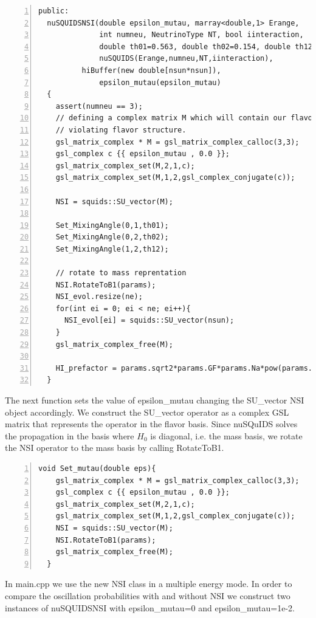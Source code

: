 \documentclass[3p,12pt]{elsarticle}
\newcommand{\ttf}{\ttfamily}
\begin{document}
\begin{lstlisting}[frame=leftline, numbers =
  left,breaklines=true,label = ex:sin1,firstnumber=last]
  public:
  nuSQUIDSNSI(double epsilon_mutau, marray<double,1> Erange,
              int numneu, NeutrinoType NT, bool iinteraction,
              double th01=0.563, double th02=0.154, double th12=0.785):
              nuSQUIDS(Erange,numneu,NT,iinteraction),
	      hiBuffer(new double[nsun*nsun]),
              epsilon_mutau(epsilon_mutau)
  {
    assert(numneu == 3);
    // defining a complex matrix M which will contain our flavor
    // violating flavor structure.
    gsl_matrix_complex * M = gsl_matrix_complex_calloc(3,3);
    gsl_complex c {{ epsilon_mutau , 0.0 }};
    gsl_matrix_complex_set(M,2,1,c);
    gsl_matrix_complex_set(M,1,2,gsl_complex_conjugate(c));
    
    NSI = squids::SU_vector(M);
    
    Set_MixingAngle(0,1,th01);
    Set_MixingAngle(0,2,th02);
    Set_MixingAngle(1,2,th12);
    
    // rotate to mass reprentation
    NSI.RotateToB1(params);
    NSI_evol.resize(ne);
    for(int ei = 0; ei < ne; ei++){
      NSI_evol[ei] = squids::SU_vector(nsun);
    }
    gsl_matrix_complex_free(M);
    
    HI_prefactor = params.sqrt2*params.GF*params.Na*pow(params.cm,-3);
  }
\end{lstlisting}

The next function sets the value of {\ttf epsilon\_mutau} changing the
 {\ttf SU\_vector NSI} object accordingly. We construct the {\ttf
   SU\_vector} operator as a complex GSL matrix that represents the
 operator in the flavor basis. Since {\ttf nuSQuIDS} solves the propagation
 in the basis where $H_0$ is diagonal, i.e. the mass basis, we rotate
 the NSI operator to the mass basis by calling {\ttf RotateToB1}.

\begin{lstlisting}[frame=leftline, numbers =
  left,breaklines=true,label = ex:sin1,firstnumber=last]
  void Set_mutau(double eps){
    gsl_matrix_complex * M = gsl_matrix_complex_calloc(3,3);
    gsl_complex c {{ epsilon_mutau , 0.0 }};
    gsl_matrix_complex_set(M,2,1,c);
    gsl_matrix_complex_set(M,1,2,gsl_complex_conjugate(c));
    NSI = squids::SU_vector(M);    
    NSI.RotateToB1(params);
    gsl_matrix_complex_free(M);
  }
\end{lstlisting}

In {\ttf main.cpp} we use the new NSI class in a
multiple energy mode. In order to compare the oscillation
probabilities with and without NSI we construct two instances of {\ttf
  nuSQUIDSNSI} with {\ttf  epsilon\_mutau=0} and {\ttf
  epsilon\_mutau=1e-2}. 
\end{document}
